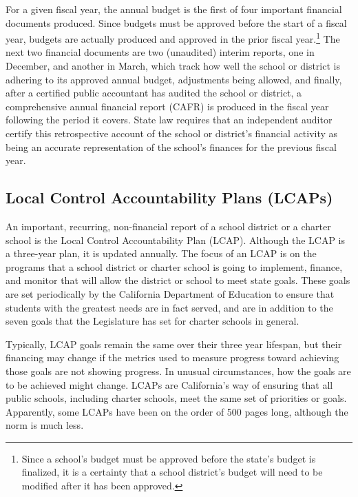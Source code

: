 For a given fiscal year, the annual budget is the first of four important financial documents produced. Since budgets must be approved before the start of a fiscal year, budgets are actually produced and approved in the prior fiscal year.\footnote{Since a school's budget must be approved before the state's budget is finalized, it is a certainty that a school district's budget will need to be modified after it has been approved.} The next two financial documents are two (unaudited) interim reports, one in December, and another in March, which track how well the school or district is adhering to its approved annual budget, adjustments being allowed, and finally, after a certified public accountant has audited the school or district, a comprehensive annual financial report (CAFR) is produced in the fiscal year following the period it covers. State law requires that an independent auditor certify this retrospective account of the school or district's financial activity as being an accurate representation of the school's finances for the previous fiscal year.

\subsection{Local Control Accountability Plans (LCAPs)}\label{sec:lcaps}\indent%

An important, recurring, non-financial report of a school district or a charter school is the Local Control Accountability Plan (LCAP).
 Although the LCAP is a three-year plan, it is updated annually. The focus of an LCAP is on the programs that a school district or charter school is going to implement, finance, and monitor that will allow the district or school to meet state goals. These goals are set periodically by the California Department of Education to ensure that students with the greatest needs are in fact served, and are in addition to the seven goals that the Legislature has set for charter schools in general.

Typically, LCAP goals remain the same over their three year lifespan, but their financing may change if the metrics used to measure progress toward achieving those goals are not showing progress. In unusual circumstances, how the goals are to be achieved might change. LCAPs are California's way of ensuring that all public schools, including charter schools, meet the same set of priorities or goals. Apparently, some LCAPs have been on the order of 500 pages long, although the norm is much less.

